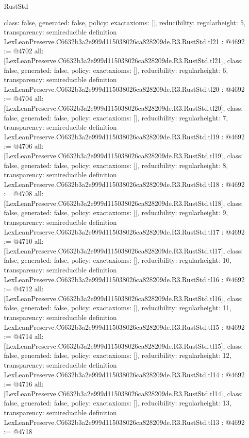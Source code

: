 \begin{lexlean}{RustStd}
\begin{coremodule}
{  class: false,
  generated: false,
  policy: exact{axioms: []},
  reducibility: regular{height: 5},
  transparency: semireducible
}
definition LexLeanPreserve.C6632b3a2e999d115038026ca828209de.R3.RustStd.tl21 : @4692 := @4702 {
  all: [LexLeanPreserve.C6632b3a2e999d115038026ca828209de.R3.RustStd.tl21],
  class: false,
  generated: false,
  policy: exact{axioms: []},
  reducibility: regular{height: 6},
  transparency: semireducible
}
definition LexLeanPreserve.C6632b3a2e999d115038026ca828209de.R3.RustStd.tl20 : @4692 := @4704 {
  all: [LexLeanPreserve.C6632b3a2e999d115038026ca828209de.R3.RustStd.tl20],
  class: false,
  generated: false,
  policy: exact{axioms: []},
  reducibility: regular{height: 7},
  transparency: semireducible
}
definition LexLeanPreserve.C6632b3a2e999d115038026ca828209de.R3.RustStd.tl19 : @4692 := @4706 {
  all: [LexLeanPreserve.C6632b3a2e999d115038026ca828209de.R3.RustStd.tl19],
  class: false,
  generated: false,
  policy: exact{axioms: []},
  reducibility: regular{height: 8},
  transparency: semireducible
}
definition LexLeanPreserve.C6632b3a2e999d115038026ca828209de.R3.RustStd.tl18 : @4692 := @4708 {
  all: [LexLeanPreserve.C6632b3a2e999d115038026ca828209de.R3.RustStd.tl18],
  class: false,
  generated: false,
  policy: exact{axioms: []},
  reducibility: regular{height: 9},
  transparency: semireducible
}
definition LexLeanPreserve.C6632b3a2e999d115038026ca828209de.R3.RustStd.tl17 : @4692 := @4710 {
  all: [LexLeanPreserve.C6632b3a2e999d115038026ca828209de.R3.RustStd.tl17],
  class: false,
  generated: false,
  policy: exact{axioms: []},
  reducibility: regular{height: 10},
  transparency: semireducible
}
definition LexLeanPreserve.C6632b3a2e999d115038026ca828209de.R3.RustStd.tl16 : @4692 := @4712 {
  all: [LexLeanPreserve.C6632b3a2e999d115038026ca828209de.R3.RustStd.tl16],
  class: false,
  generated: false,
  policy: exact{axioms: []},
  reducibility: regular{height: 11},
  transparency: semireducible
}
definition LexLeanPreserve.C6632b3a2e999d115038026ca828209de.R3.RustStd.tl15 : @4692 := @4714 {
  all: [LexLeanPreserve.C6632b3a2e999d115038026ca828209de.R3.RustStd.tl15],
  class: false,
  generated: false,
  policy: exact{axioms: []},
  reducibility: regular{height: 12},
  transparency: semireducible
}
definition LexLeanPreserve.C6632b3a2e999d115038026ca828209de.R3.RustStd.tl14 : @4692 := @4716 {
  all: [LexLeanPreserve.C6632b3a2e999d115038026ca828209de.R3.RustStd.tl14],
  class: false,
  generated: false,
  policy: exact{axioms: []},
  reducibility: regular{height: 13},
  transparency: semireducible
}
definition LexLeanPreserve.C6632b3a2e999d115038026ca828209de.R3.RustStd.tl13 : @4692 := @4718 {
}
\end{coremodule}
\end{lexlean}
